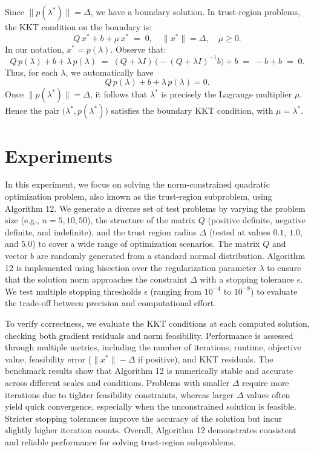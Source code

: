 \documentclass[12pt]{article}
\begin{document}
Since \(\|p(\lambda^*)\|=\Delta\), we have a boundary solution. In trust-region problems, the KKT condition on the boundary is:
\[
Q\,x^* + b + \mu \, x^* \;=\; 0, 
\quad
\|x^*\| = \Delta,
\quad
\mu \ge 0.
\]
In our notation, \(x^*=p(\lambda)\). Observe that:
\[
Q\,p(\lambda) + b + \lambda\,p(\lambda)
\;=\;(Q+\lambda I)\,\bigl(-(Q+\lambda I)^{-1}b\bigr) + b 
\;=\;-b + b
\;=\;0.
\]
Thus, for each \(\lambda\), we automatically have
\[
Q\,p(\lambda) + b + \lambda\,p(\lambda) = 0.
\]
Once \(\|p(\lambda^*)\| = \Delta\), it follows that \(\lambda^*\) is precisely the Lagrange multiplier \(\mu\). Hence the pair \(\bigl(\lambda^*, p(\lambda^*)\bigr)\) satisfies the boundary KKT condition, with \(\mu=\lambda^*\). 

\section{Experiments}


In this experiment, we focus on solving the norm-constrained quadratic optimization problem, also known as the trust-region subproblem, using Algorithm 12. We generate a diverse set of test problems by varying the problem size (e.g., $n=5, 10, 50$), the structure of the matrix $Q$ (positive definite, negative definite, and indefinite), and the trust region radius $\Delta$ (tested at values $0.1$, $1.0$, and $5.0$) to cover a wide range of optimization scenarios. The matrix $Q$ and vector $b$ are randomly generated from a standard normal distribution. Algorithm 12 is implemented using bisection over the regularization parameter $\lambda$ to ensure that the solution norm approaches the constraint $\Delta$ with a stopping tolerance $\epsilon$. We test multiple stopping thresholds $\epsilon$ (ranging from $10^{-4}$ to $10^{-8}$) to evaluate the trade-off between precision and computational effort.

To verify correctness, we evaluate the KKT conditions at each computed solution, checking both gradient residuals and norm feasibility. Performance is assessed through multiple metrics, including the number of iterations, runtime, objective value, feasibility error ($\|x^*\| - \Delta$ if positive), and KKT residuals. The benchmark results show that Algorithm 12 is numerically stable and accurate across different scales and conditions. Problems with smaller $\Delta$ require more iterations due to tighter feasibility constraints, whereas larger $\Delta$ values often yield quick convergence, especially when the unconstrained solution is feasible. Stricter stopping tolerances improve the accuracy of the solution but incur slightly higher iteration counts. Overall, Algorithm 12 demonstrates consistent and reliable performance for solving trust-region subproblems.
\end{document}
